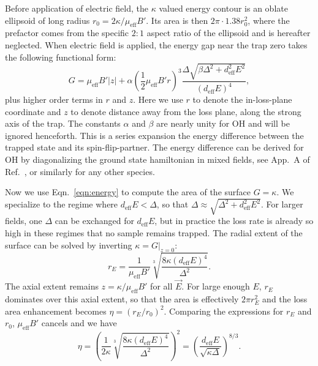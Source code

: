 \documentclass[%
 reprint,
 amsmath,amssymb,
 aps,
pra,
]{revtex4-1}
\begin{document}
Before application of electric field, the $\kappa$ valued energy contour is an oblate ellipsoid of long radius $r_0=2\kappa/\mu_\text{eff}B'$. 
Its area is then $2\pi\cdot1.38r_0^2$, where the prefactor comes from the specific $2:1$ aspect ratio of the ellipsoid and is hereafter neglected.
When electric field is applied, the energy gap near the trap zero takes the following functional form:
\begin{equation}
\label{eqn:energy}
G = \mu_\text{eff}B'|z| + \alpha(\frac{1}{2}\mu_\text{eff}B'r)^3\frac{\Delta\sqrt{\beta\Delta^2\!+\!d_\text{eff}^2E^2}}{(d_\text{eff}E)^4},%
\end{equation}
plus higher order terms in $r$ and $z$. 
Here we use $r$ to denote the in-loss-plane coordinate and $z$ to denote distance away from the loss plane, along the strong axis of the trap. 
The constants $\alpha$ and $\beta$ are nearly unity for OH and will be ignored henceforth.
This is a series expansion the energy difference between the trapped state and its spin-flip-partner.
The energy difference can be derived for OH by diagonalizing the ground state hamiltonian in mixed fields, see App.~A of Ref.~\cite{stuhl2012uwave}, or similarly for any other species.

Now we use Eqn.~\ref{eqn:energy} to compute the area of the surface $G=\kappa$.
We specialize to the regime where $d_\text{eff}E<\Delta$, so that $\Delta\approx\sqrt{\Delta^2+d_\text{eff}^2E^2}$. 
For larger fields, one $\Delta$ can be exchanged for $d_\text{eff}E$, but in practice the loss rate is already so high in these regimes that no sample remains trapped.
The radial extent of the surface can be solved by inverting $\kappa=G|_{z=0}$:
\begin{equation}
\label{eqn:rE}
r_E = \frac{1}{\mu_\text{eff}B'}\sqrt[3]{\frac{8\kappa(d_\text{eff}E)^4}{\Delta^2}}.
\end{equation}
The axial extent remains $z=\kappa/\mu_\text{eff}B'$ for all $\vec{E}$.
For large enough $E$, $r_E$ dominates over this axial extent, so that the area is effectively $2\pi r_E^2$ and the loss area enhancement becomes $\eta = (r_E/r_0)^2$.
Comparing the expressions for $r_E$ and $r_0$, $\mu_\text{eff}B'$ cancels and we have
\begin{equation}
\label{eqn:eta}
\eta= \left(\frac{1}{2\kappa}\sqrt[3]{\frac{8\kappa(d_\text{eff}E)^4}{\Delta^2}}\right)^2=\left(\frac{d_\text{eff}E}{\sqrt{\kappa\Delta}}\right)^{8/3}.
\end{equation}
\end{document}
